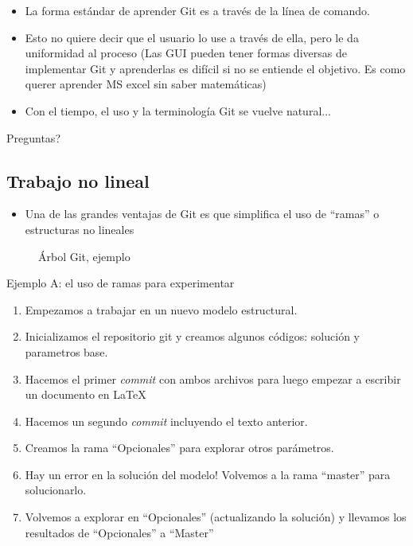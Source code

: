 \documentclass[10pt, aspectratio=169]{beamer}
\begin{document}
\begin{frame}[<+->]{\subsecname}
	\begin{itemize}
		\item La forma estándar de aprender Git es a través de la línea de comando.
		\vfill \item Esto no quiere decir que el usuario lo use a través de ella, pero le da uniformidad al proceso \textcolor{UBCgrey}{(Las GUI pueden tener formas diversas de implementar Git y aprenderlas es difícil si no se entiende el objetivo. Es como querer aprender MS excel sin saber matemáticas)}
		\vfill \item Con el tiempo, el uso y la terminología Git se vuelve natural... \onslide<+->{trust me!}
	\end{itemize}
\end{frame}

\begin{frame}[standout]{\secname}
	Preguntas?
\end{frame}

\subsection{Trabajo no lineal}
\begin{frame}[<+->]{\subsecname}  
	\begin{itemize}
		\item Una de las grandes ventajas de Git es que simplifica el uso de ``ramas'' o estructuras no lineales 
	\end{itemize}
	\begin{figure}[H]
		\centering
		\caption{Árbol Git, ejemplo}
	\end{figure}
\end{frame}

\begin{frame}[<+->]{\subsecname}  
	\begin{exampleblock}{Ejemplo A: el uso de ramas para experimentar}
		\begin{enumerate}
			\item Empezamos a trabajar en un nuevo modelo estructural.
			\item Inicializamos el repositorio git y creamos algunos códigos: solución y parametros base.
			\item Hacemos el primer \emph{commit} con ambos archivos para luego empezar a escribir un documento en \LaTeX
			\item Hacemos un segundo \emph{commit} incluyendo el texto anterior.
			\item Creamos la rama ``Opcionales'' para explorar otros parámetros.
			\item Hay un error en la solución del modelo! Volvemos a la rama ``master'' para solucionarlo.
			\item Volvemos a explorar en ``Opcionales'' (actualizando la solución) y llevamos los resultados de ``Opcionales'' a ``Master''
		\end{enumerate}
	\end{exampleblock}
\end{frame}
\end{document}
